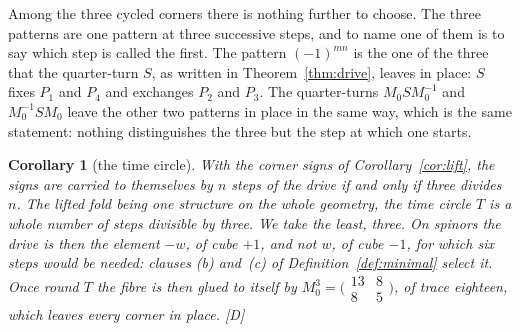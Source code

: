\documentclass[11pt,a4paper]{article}
\theoremstyle{plain}
\newtheorem{corollary}[theorem]{Corollary}
\theoremstyle{definition}
\theoremstyle{remark}
\newcommand{\rigD}{[\textup{D}]}
\begin{document}
Among the three cycled corners there is nothing further to choose. The three patterns are one pattern at three successive steps, and to name one of them is to say which step is called the first. The pattern $(-1)^{mn}$ is the one of the three that the quarter-turn $S$, as written in Theorem~\ref{thm:drive}, leaves in place: $S$ fixes $P_{1}$ and $P_{4}$ and exchanges $P_{2}$ and $P_{3}$. The quarter-turns $M_{0}SM_{0}^{-1}$ and $M_{0}^{-1}SM_{0}$ leave the other two patterns in place in the same way, which is the same statement: nothing distinguishes the three but the step at which one starts.

\begin{corollary}[the time circle]\label{cor:timecircle}
With the corner signs of Corollary~\ref{cor:lift}, the signs are carried to themselves by $n$ steps of the drive if and only if three divides $n$. The lifted fold being one structure on the whole geometry, the time circle $T$ is a whole number of steps divisible by three. We take the least, three. On spinors the drive is then the element $-w$, of cube $+1$, and not $w$, of cube $-1$, for which six steps would be needed: clauses (b) and~(c) of Definition~\ref{def:minimal} select it. Once round $T$ the fibre is then glued to itself by $M_{0}^{3}=\bigl(\begin{smallmatrix}13&8\\8&5\end{smallmatrix}\bigr)$, of trace eighteen, which leaves every corner in place. \rigD
\end{corollary}
\end{document}
